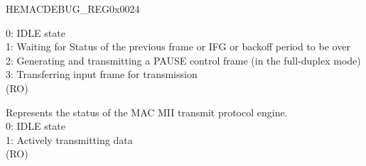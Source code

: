 \begin{register}{H}{EMACDEBUG\_REG}{0x0024}
\begin{regdesc}
\begin{reglist}
0: IDLE state\\
1: Waiting for Status of the previous frame or IFG or backoff period to be over\\
2: Generating and transmitting a PAUSE control frame (in the full-duplex mode)\\
3: Transferring input frame for transmission\\
(RO)
\item [MACTPES] Represents the status of the MAC MII transmit protocol engine.\\
0: IDLE state\\
1: Actively transmitting data\\(RO)

\item[Continued on the next page...]
\end{reglist}\end{regdesc}
\end{register}
\addtocounter{Regfloat}{-1}
